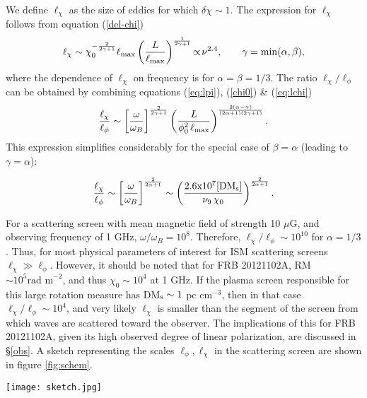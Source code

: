 \documentclass[fleqn,usenatbib]{mnras}
\begin{document}
	We define $\ell_{\chi}$ as the size of eddies for which $\delta\chi \sim 1$. The expression for $\ell_{\chi}$ follows from equation (\ref{del-chi})
	\begin{equation}
		\label{eq:lchi}
		\ell_{\chi} \sim \chi_0^{-{2\over 2\gamma+1}} \ell_{\rm max} \left(\frac{L}{\ell_{\rm max}}\right)^{1\over 2\gamma+1}\!\propto \! \nu^{2.4}, \quad\quad \gamma=\min(\alpha,\beta), 
	\end{equation}
	where the dependence of $\ell_\chi$ on frequency is for $\alpha=\beta=1/3$. The ratio $\ell_\chi/\ell_\phi$ can be obtained by combining equations (\ref{eq:lpi}), (\ref{chi0}) \& (\ref{eq:lchi})
	\begin{equation}
		{\ell_\chi\over\ell_\phi} \sim \left[{\omega\over\omega_B}\right]^{2\over 2\gamma+1} \left( {L\over\phi_0^2\,\ell_{\rm max} }\right)^{2(\alpha-\gamma)\over (2\alpha+1)(2\gamma+1)}.
	\end{equation}
	This expression simplifies considerably for the special case of $\beta=\alpha$ (leading to $\gamma=\alpha$):
	
	\begin{equation}
		{\ell_\chi\over\ell_\phi} \sim \left[{\omega\over\omega_B}\right]^{2\over 2\alpha+1} \sim \left( {2.6{\rm x}10^7  [{\rm DM_s}]\over \nu_9\,\chi_0}\right)^{2\over 2\alpha+1}.
		\label{lchi_lphi}
	\end{equation}
	
	For a scattering screen with mean magnetic field of strength 10 $\mu$G, and observing frequency of 1 GHz, $\omega/\omega_B=10^8$. Therefore, $\ell_\chi/\ell_\phi \sim 10^{10}$ for $\alpha=1/3$. Thus, for most physical parameters of interest for ISM scattering screens $\ell_\chi \gg\ell_\phi$. However, it should be noted that for FRB 20121102A, RM $\sim 10^5\mbox{rad m}^{-2}$, and thus $\chi_0\sim 10^4$ at 1 GHz. If the plasma screen responsible for this large rotation measure has DM$_{\rm s}\sim 1$ pc cm$^{-3}$, then in that case $\ell_\chi/\ell_\phi\sim 10^4$, and very likely $\ell_\chi$ is smaller than the segment of the screen from which waves are scattered toward the observer. The implications of this for FRB 20121102A, given its high observed degree of linear polarization, are discussed in \S \ref{obs}.
	A sketch representing the scales $\ell_{\phi},\ell_{\chi}$ in the scattering screen are shown in figure \ref{fig:schem}.
	
	\begin{figure*}
		\centering
		\texttt{[image: sketch.jpg]}
		\caption{Schematic sketch depicting the passage of a wave through a turbulent scattering screen, which changes the phase of the incoming wave (at its central frequency) on a spatial scale $\ell_{\phi}$ and its PA on a spatial scale $\ell_{\chi}$. For most cases of interest $\ell_{\chi}\gg \ell_{\phi}$.}
		\label{fig:schem}
	\end{figure*}
	
\end{document}
